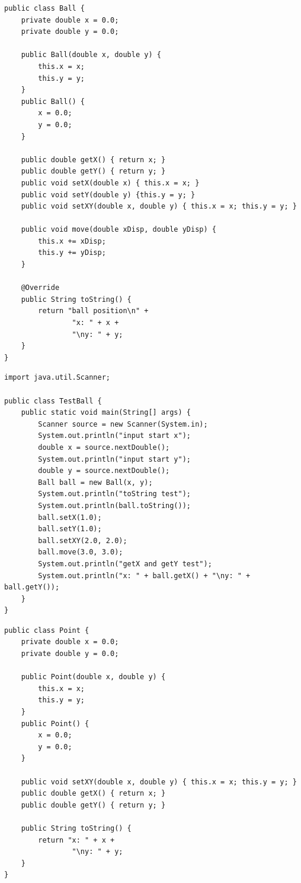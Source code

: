 \documentclass[14pt, a4paper]{extarticle}
\newenvironment{code}{\captionsetup{type=listing}}{}
\begin{document}
\begin{code}
\begin{Verbatim}[frame=single, fontsize=\footnotesize]
public class Ball {
    private double x = 0.0;
    private double y = 0.0;

    public Ball(double x, double y) {
        this.x = x;
        this.y = y;
    }
    public Ball() {
        x = 0.0;
        y = 0.0;
    }

    public double getX() { return x; }
    public double getY() { return y; }
    public void setX(double x) { this.x = x; }
    public void setY(double y) {this.y = y; }
    public void setXY(double x, double y) { this.x = x; this.y = y; }

    public void move(double xDisp, double yDisp) {
        this.x += xDisp;
        this.y += yDisp;
    }

    @Override
    public String toString() {
        return "ball position\n" +
                "x: " + x +
                "\ny: " + y;
    }
}
\end{Verbatim}
\end{code}
\begin{code}
\begin{Verbatim}[frame=single, fontsize=\footnotesize]
import java.util.Scanner;

public class TestBall {
    public static void main(String[] args) {
        Scanner source = new Scanner(System.in);
        System.out.println("input start x");
        double x = source.nextDouble();
        System.out.println("input start y");
        double y = source.nextDouble();
        Ball ball = new Ball(x, y);
        System.out.println("toString test");
        System.out.println(ball.toString());
        ball.setX(1.0);
        ball.setY(1.0);
        ball.setXY(2.0, 2.0);
        ball.move(3.0, 3.0);
        System.out.println("getX and getY test");
        System.out.println("x: " + ball.getX() + "\ny: " + ball.getY());
    }
}
\end{Verbatim}
\end{code}
\begin{code}
\begin{Verbatim}[frame=single, fontsize=\footnotesize]
public class Point {
    private double x = 0.0;
    private double y = 0.0;

    public Point(double x, double y) {
        this.x = x;
        this.y = y;
    }
    public Point() {
        x = 0.0;
        y = 0.0;
    }

    public void setXY(double x, double y) { this.x = x; this.y = y; }
    public double getX() { return x; }
    public double getY() { return y; }

    public String toString() {
        return "x: " + x +
                "\ny: " + y;
    }
}
\end{Verbatim}
\end{code}
\end{document}
